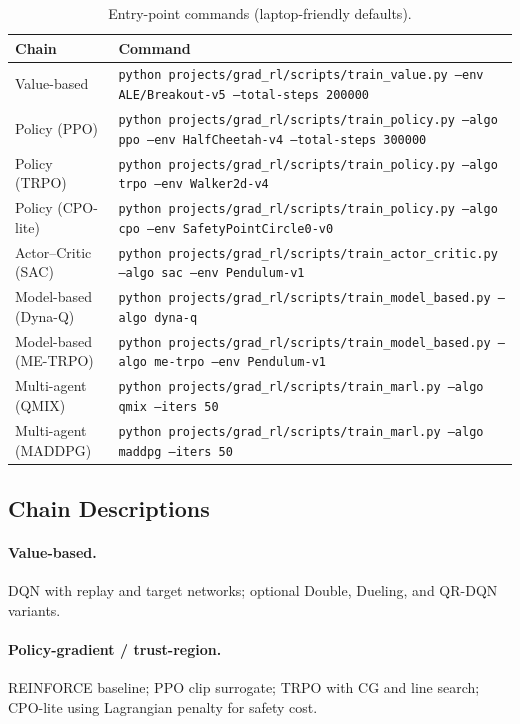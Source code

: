\documentclass[12pt]{article}
\newcommand{\code}[1]{\texttt{#1}}
\begin{document}
\begin{table}[h]
    \centering
    \caption{Entry-point commands (laptop-friendly defaults).}\label{tab:commands}
    \begin{tabular}{ll}
        \toprule
        Chain & Command \\
        \midrule
        Value-based & \code{python projects/grad\_rl/scripts/train\_value.py --env ALE/Breakout-v5 --total-steps 200000} \\
        Policy (PPO) & \code{python projects/grad\_rl/scripts/train\_policy.py --algo ppo --env HalfCheetah-v4 --total-steps 300000} \\
        Policy (TRPO) & \code{python projects/grad\_rl/scripts/train\_policy.py --algo trpo --env Walker2d-v4} \\
        Policy (CPO-lite) & \code{python projects/grad\_rl/scripts/train\_policy.py --algo cpo --env SafetyPointCircle0-v0} \\
        Actor--Critic (SAC) & \code{python projects/grad\_rl/scripts/train\_actor\_critic.py --algo sac --env Pendulum-v1} \\
        Model-based (Dyna-Q) & \code{python projects/grad\_rl/scripts/train\_model\_based.py --algo dyna-q} \\
        Model-based (ME-TRPO) & \code{python projects/grad\_rl/scripts/train\_model\_based.py --algo me-trpo --env Pendulum-v1} \\
        Multi-agent (QMIX) & \code{python projects/grad\_rl/scripts/train\_marl.py --algo qmix --iters 50} \\
        Multi-agent (MADDPG) & \code{python projects/grad\_rl/scripts/train\_marl.py --algo maddpg --iters 50} \\
        \bottomrule
    \end{tabular}
\end{table}

\subsection{Chain Descriptions}
\paragraph{Value-based.} DQN with replay and target networks; optional Double, Dueling, and QR-DQN variants.
\paragraph{Policy-gradient / trust-region.} REINFORCE baseline; PPO clip surrogate; TRPO with CG and line search; CPO-lite using Lagrangian penalty for safety cost.
\end{document}
